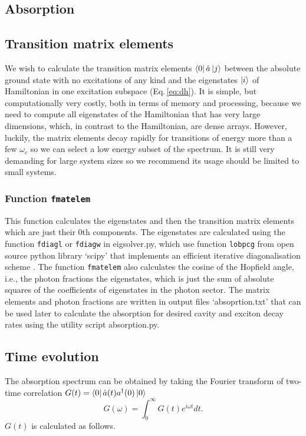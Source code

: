 \documentclass[final,twocolumn]{elsarticle}
\begin{document}
\begin{small}
\section{Absorption}
\subsection{Transition matrix elements}
We wish to calculate the transition matrix elements $\bra{0} \hat a \ket{j}$
between the absolute ground state with no excitations of any kind and the eigenstates $\ket{i}$
of Hamiltonian in one excitation subspace (Eq.\,\ref{eq:dh}).
It is simple, but computationally very costly,
 both in terms of memory and processing,
because we need to compute
all eigenstates of the Hamiltonian that has very large dimensions,
which, in contrast to the Hamiltonian, are dense arrays.
However,
luckily, the matrix elements decay rapidly for transitions 
of energy more than a few $\omega_c$
so
we can select a low energy subset of
the spectrum. 
It is still very demanding for large system sizes so we recommend
 its usage should be limited to small systems.

\subsubsection{Function \texttt{fmatelem}}

This function calculates the eigenstates and then the transition matrix elements
which are just their $0$th components.
The eigenstates are calculated using the function
\texttt{fdiagl} or \texttt{fdiagw} in eigsolver.py, which
use function \texttt{lobpcg} from open source python library `scipy' \cite{scipy}
that implements an efficient iterative diagonalisation scheme \cite{lobpcg}.
The function \texttt{fmatelem} also calculates the cosine of the Hopfield angle,
 i.e., the photon fractions the eigenstates, 
 which is just the sum of absolute squares of 
 the coefficients of eigenstates in the photon sector.
 The matrix elements and photon fractions are written in output files
 `absoprtion.txt' that can be used later to calculate the absorption
  for desired cavity and exciton decay rates using the utility script
  absorption.py.
  


\subsection{Time evolution} %
The absorption spectrum can be obtained by 
taking the Fourier transform of two-time correlation 
$G(t) = \bra{0} \hat a(t)a^\dagger(0) \ket{0}$
\begin{displaymath}
G(\omega) = \int_0^\infty{G(t) e^{i\omega t} dt}.
\end{displaymath}
$G(t)$ is calculated as follows.


\end{small}
\end{document}
